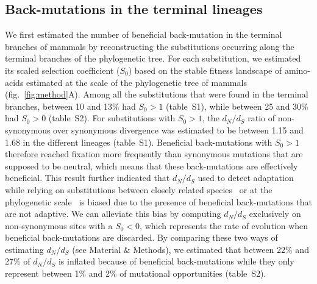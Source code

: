 \documentclass{article}
\newcommand{\dn}{d_N}
\newcommand{\ds}{d_S}
\newcommand{\dnds}{\dn / \ds}
\newcommand{\Sphy}{S_{0}}
\begin{document}
    \subsection*{Back-mutations in the terminal lineages}
    We first estimated the number of beneficial back-mutation in the terminal branches of mammals by reconstructing the substitutions occurring along the terminal branches of the phylogenetic tree.
    For each substitution, we estimated its scaled selection coefficient ($\Sphy$) based on the stable fitness landscape of amino-acids estimated at the scale of the phylogenetic tree of mammals (fig.~\ref{fig:method}A).
    Among all the substitutions that were found in the terminal branches, between 10 and 13\% had $\Sphy > 1$ (table~S1), while between 25 and 30\% had $\Sphy > 0$ (table~S2).
    For substitutions with $\Sphy > 1$, the $\dnds$ ratio of non-synonymous over synonymous divergence was estimated to be between 1.15 and 1.68 in the different lineages (table~S1).
    Beneficial back-mutations with $\Sphy > 1$ therefore reached fixation more frequently than synonymous mutations that are supposed to be neutral, which means that these back-mutations are effectively beneficial.
    This result further indicated that $\dnds$ used to detect adaptation while relying on substitutions between closely related species~\cite{mcdonald_adaptative_1991, galtier_adaptive_2016} or at the phylogenetic scale~\cite{goldman_codonbased_1994, yang_codonsubstitution_2002} is biased due to the presence of beneficial back-mutations that are not adaptive.
    We can alleviate this bias by computing $\dnds$ exclusively on non-synonymous sites with a $\Sphy < 0$, which represents the rate of evolution when beneficial back-mutations are discarded.
    By comparing these two ways of estimating $\dnds$ (see Material \& Methods), we estimated that between 22\% and 27\% of $\dnds$ is inflated because of beneficial back-mutations while they only represent between 1\% and 2\% of mutational opportunities (table~S2).
\end{document}
